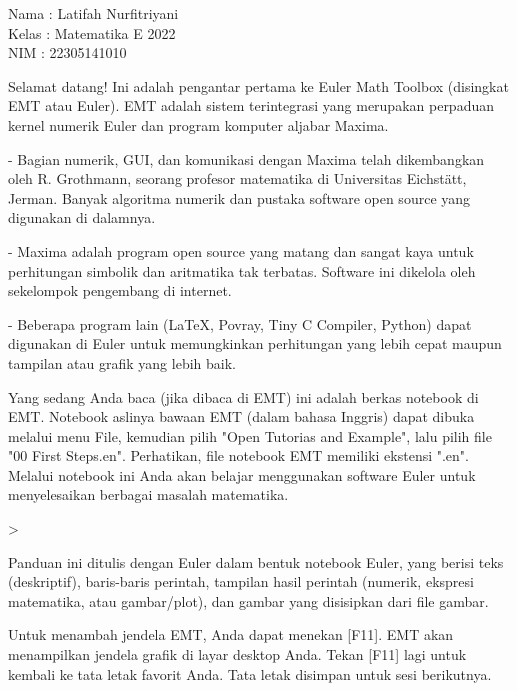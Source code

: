 \documentclass[a4paper,10pt]{article}
\begin{document}
\begin{eulernotebook}
\begin{eulercomment}
Nama  : Latifah Nurfitriyani\\
Kelas : Matematika E 2022\\
NIM   : 22305141010\\
\end{eulercomment}
\eulersubheading{}
\begin{eulercomment}
Selamat datang! Ini adalah pengantar pertama ke Euler Math Toolbox
(disingkat EMT atau Euler). EMT adalah sistem terintegrasi yang
merupakan perpaduan kernel numerik Euler dan program komputer aljabar
Maxima.

- Bagian numerik, GUI, dan komunikasi dengan Maxima telah dikembangkan
oleh R. Grothmann, seorang profesor matematika di Universitas
Eichstätt, Jerman. Banyak algoritma numerik dan pustaka software open
source yang digunakan di dalamnya.

- Maxima adalah program open source yang matang dan sangat kaya untuk
perhitungan simbolik dan aritmatika tak terbatas. Software ini
dikelola oleh sekelompok pengembang di internet.

- Beberapa program lain (LaTeX, Povray, Tiny C Compiler, Python) dapat
digunakan di Euler untuk memungkinkan perhitungan yang lebih cepat
maupun tampilan atau grafik yang lebih baik.

Yang sedang Anda baca (jika dibaca di EMT) ini adalah berkas notebook
di EMT. Notebook aslinya bawaan EMT (dalam bahasa Inggris) dapat
dibuka melalui menu File, kemudian pilih "Open Tutorias and Example",
lalu pilih file "00 First Steps.en". Perhatikan, file notebook EMT
memiliki ekstensi ".en". Melalui notebook ini Anda akan belajar
menggunakan software Euler untuk menyelesaikan berbagai masalah
matematika.
\end{eulercomment}
\begin{eulerprompt}
> 
\end{eulerprompt}
\begin{eulercomment}
Panduan ini ditulis dengan Euler dalam bentuk notebook Euler, yang
berisi teks (deskriptif), baris-baris perintah, tampilan hasil
perintah (numerik, ekspresi matematika, atau gambar/plot), dan gambar
yang disisipkan dari file gambar.

Untuk menambah jendela EMT, Anda dapat menekan [F11]. EMT akan
menampilkan jendela grafik di layar desktop Anda. Tekan [F11] lagi
untuk kembali ke tata letak favorit Anda. Tata letak disimpan untuk
sesi berikutnya.


\end{eulercomment}
\end{eulernotebook}
\end{document}
